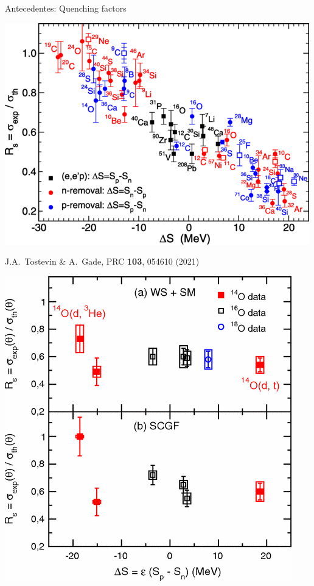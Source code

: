 \documentclass{beamer}
\begin{document}
\begin{frame}{Antecedentes: Quenching factors} 
    \begin{minipage}{0.45\textwidth}
    \begin{center}
    \includegraphics[height=0.3\textheight]{Tostevin.png}
    
    \tiny J.A.~Tostevin \& A.~Gade, PRC \textbf{103}, 054610 (2021)
    \end{center}
    \end{minipage}
    \begin{minipage}{0.45\textwidth}
    \begin{center}
    \includegraphics[height=0.3\textheight]{flavigny.png}
   

\end{center}
\end{minipage}
\end{frame}
\end{document}
